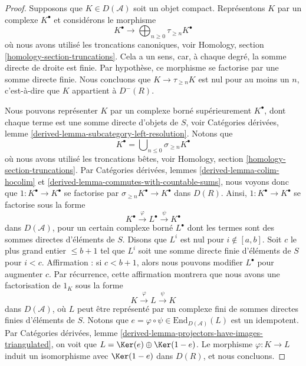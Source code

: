 \begin{proof}
Supposons que $K \in D(\mathcal{A})$ soit un objet compact. Représentons $K$
par un complexe $K^\bullet$ et considérons le morphisme
$$
K^\bullet
\longrightarrow
\bigoplus\nolimits_{n \geq 0} \tau_{\geq n} K^\bullet
$$
où nous avons utilisé les troncations canoniques, voir Homology, section
\ref{homology-section-truncations}. Cela a un sens, car, à chaque degré, la
somme directe de droite est finie. Par hypothèse, ce morphisme se factorise
par une somme directe finie. Nous concluons que
$K \to \tau_{\geq n} K$ est nul pour au moins un $n$, c'est-à-dire que $K$
appartient à $D^{-}(R)$.

\medskip\noindent
Nous pouvons représenter $K$ par un complexe borné supérieurement
$K^\bullet$, dont chaque terme est une somme directe d'objets de $S$, voir
Catégories dérivées, lemme \ref{derived-lemma-subcategory-left-resolution}.
Notons que
$$
K^\bullet = \bigcup\nolimits_{n \leq 0} \sigma_{\geq n}K^\bullet
$$
où nous avons utilisé les troncations bêtes, voir Homology, section
\ref{homology-section-truncations}. Par Catégories dérivées, lemmes
\ref{derived-lemma-colim-hocolim} et
\ref{derived-lemma-commutes-with-countable-sums}, nous voyons donc que
$1 : K^\bullet \to K^\bullet$ se factorise par
$\sigma_{\geq n}K^\bullet \to K^\bullet$ dans $D(R)$. Ainsi,
$1 : K^\bullet \to K^\bullet$ se factorise sous la forme
$$
K^\bullet \xrightarrow{\varphi} L^\bullet \xrightarrow{\psi} K^\bullet
$$
dans $D(\mathcal{A})$, pour un certain complexe borné $L^\bullet$ dont les
termes sont des sommes directes d'éléments de $S$. Disons que $L^i$ est nul
pour $i \not \in [a, b]$. Soit $c$ le plus grand entier $\leq b + 1$ tel que
$L^i$ soit une somme directe finie d'éléments de $S$ pour $i < c$.
Affirmation : si $c < b + 1$, alors nous pouvons modifier $L^\bullet$ pour
augmenter $c$. Par récurrence, cette affirmation montrera que nous avons une
factorisation de $1_K$ sous la forme
$$
K \xrightarrow{\varphi} L \xrightarrow{\psi} K
$$
dans $D(\mathcal{A})$, où $L$ peut être représenté par un complexe fini de
sommes directes finies d'éléments de $S$. Notons que
$e = \varphi \circ \psi \in \text{End}_{D(\mathcal{A})}(L)$ est un
idempotent. Par Catégories dérivées, lemme
\ref{derived-lemma-projectors-have-images-triangulated}, on voit que
$L = \Ker(e) \oplus \Ker(1 - e)$. Le morphisme $\varphi : K \to L$ induit un
isomorphisme avec $\Ker(1 - e)$ dans $D(R)$, et nous concluons.


\end{proof}
